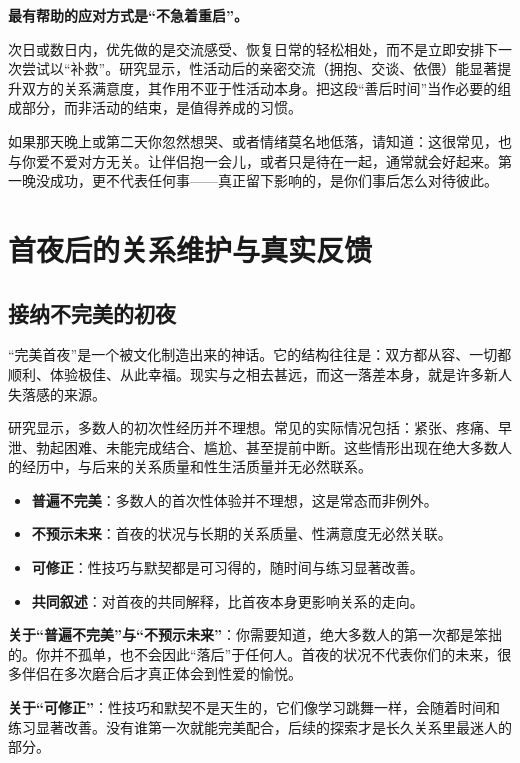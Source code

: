 \documentclass[12pt,UTF8]{ctexbook}
\begin{document}
\textbf{最有帮助的应对方式是“不急着重启”。}

次日或数日内，优先做的是交流感受、恢复日常的轻松相处，而不是立即安排下一次尝试以“补救”。研究显示，性活动后的亲密交流（拥抱、交谈、依偎）能显著提升双方的关系满意度，其作用不亚于性活动本身。把这段“善后时间”当作必要的组成部分，而非活动的结束，是值得养成的习惯。

\begin{tcolorbox}[colback=pink!5!white,colframe=red!50!black,title=贴心小叮咛]
如果那天晚上或第二天你忽然想哭、或者情绪莫名地低落，请知道：这很常见，也与你爱不爱对方无关。让伴侣抱一会儿，或者只是待在一起，通常就会好起来。第一晚没成功，更不代表任何事——真正留下影响的，是你们事后怎么对待彼此。
\end{tcolorbox}

\section{首夜后的关系维护与真实反馈}

\subsection{接纳不完美的初夜}

“完美首夜”是一个被文化制造出来的神话。它的结构往往是：双方都从容、一切都顺利、体验极佳、从此幸福。现实与之相去甚远，而这一落差本身，就是许多新人失落感的来源。

研究显示，多数人的初次性经历并不理想。常见的实际情况包括：紧张、疼痛、早泄、勃起困难、未能完成结合、尴尬、甚至提前中断。这些情形出现在绝大多数人的经历中，与后来的关系质量和性生活质量并无必然联系。

\begin{itemize}
\item \textbf{普遍不完美}：多数人的首次性体验并不理想，这是常态而非例外。
\item \textbf{不预示未来}：首夜的状况与长期的关系质量、性满意度无必然关联。
\item \textbf{可修正}：性技巧与默契都是可习得的，随时间与练习显著改善。
\item \textbf{共同叙述}：对首夜的共同解释，比首夜本身更影响关系的走向。
\end{itemize}

\textbf{关于“普遍不完美”与“不预示未来”}：你需要知道，绝大多数人的第一次都是笨拙的。你并不孤单，也不会因此“落后”于任何人。首夜的状况不代表你们的未来，很多伴侣在多次磨合后才真正体会到性爱的愉悦。

\textbf{关于“可修正”}：性技巧和默契不是天生的，它们像学习跳舞一样，会随着时间和练习显著改善。没有谁第一次就能完美配合，后续的探索才是长久关系里最迷人的部分。
\end{document}
